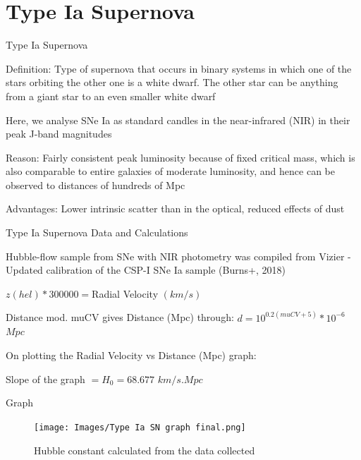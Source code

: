 \documentclass[aspectratio=169]{beamer}                    %
\begin{document}
\section{Type Ia Supernova}
\begin{frame}{Type Ia Supernova}
    \begin{vfilleditems}
        \item Definition: Type of supernova that occurs in binary systems in which one of the stars orbiting the other one is a white dwarf. The other star can be anything from a giant star to an even smaller white dwarf
        \item Here, we analyse SNe Ia as standard candles in the near-infrared (NIR) in their peak J-band magnitudes 
        \item Reason: Fairly consistent peak luminosity because of fixed critical mass, which is also comparable to entire galaxies of moderate luminosity, and hence can be observed to distances of hundreds of Mpc
        \item Advantages: Lower intrinsic scatter than in the optical, reduced effects of dust
    \end{vfilleditems}
    
\end{frame}

\begin{frame}{Type Ia Supernova Data and Calculations}
    \begin{vfilleditems}
        \item Hubble-flow sample from SNe with NIR photometry was compiled from Vizier - Updated calibration of the CSP-I SNe Ia sample (Burns+, 2018)
        \item $z(hel) * 300000 = $Radial Velocity $(km/s)$
        \item Distance mod. muCV gives Distance (Mpc) through:
        $d = 10^{0.2(muCV+5)} * 10^{-6}$ $Mpc$
        \item On plotting the Radial Velocity vs Distance (Mpc) graph:
        
        Slope of the graph $= H_0 = 68.677$ $km/s.Mpc$
    \end{vfilleditems}
    
\end{frame}

\begin{frame}{Graph}
    \begin{figure}[htp]
        \centering
        \texttt{[image: Images/Type Ia SN graph final.png]}
        \caption{Hubble constant calculated from the data collected}
        \label{fig:Type Ia SN graph final}
    \end{figure}
\end{frame}
\end{document}
